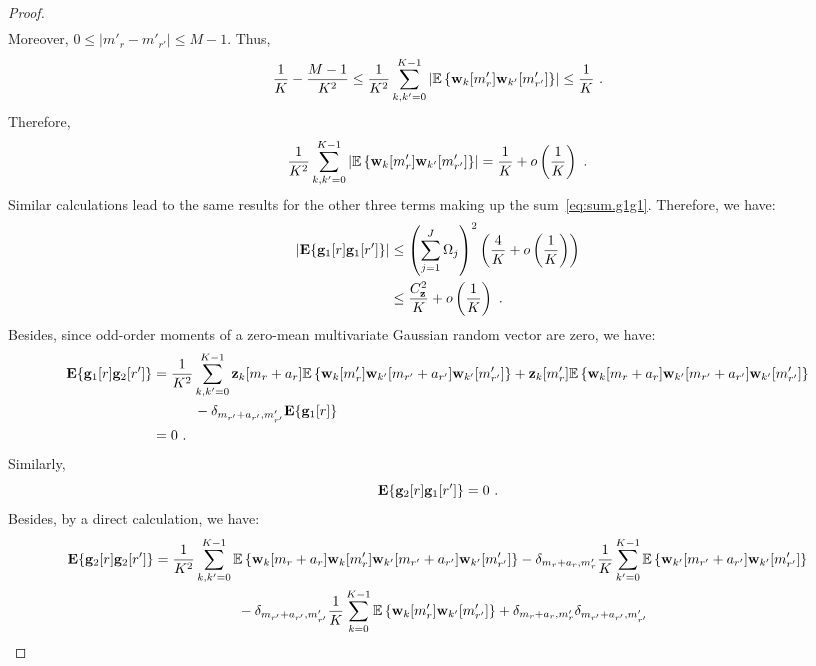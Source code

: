 \documentclass[journal,onecolumn]{IEEEtran}
\begin{document}
\begin{proof}
\begin{align*}
\end{align*}
Moreover, $0\leq\left|m'_r-m'_{r'}\right|\leq M-1$. Thus,
\begin{align*}
\dfrac1{K} - \dfrac{M-1}{K^2}\leq \dfrac1{K^2}\sum_{k,k'=0}^{K-1} \left|{\mathbb E}\left\{{\mathbf w}_k[m'_r]{\mathbf w}_{k'}[m'_{r'}]\right\}\right| \leq \dfrac1{K}\ .
\end{align*}
Therefore,
\begin{align*}
\dfrac1{K^2}\sum_{k,k'=0}^{K-1} \left|{\mathbb E}\left\{{\mathbf w}_k[m'_r]{\mathbf w}_{k'}[m'_{r'}]\right\}\right| = \dfrac1{K} + o\left(\dfrac1K\right)\ .
\end{align*}
Similar calculations lead to the same results for the other three terms making up the sum~\eqref{eq:sum.g1g1}.  Therefore, we have:
\begin{align}
\nonumber
\left|\bE\{\bg_1[r]\bg_1[r']\}\right| &\leq \left(\sum_{j=1}^J \Omega_j\right)^2 \left(\dfrac4{K} + o\left(\dfrac1{K}\right) \right) \\
&\leq \dfrac{C_\bz^2}{K} + o\left(\dfrac1{K}\right)\ .
\label{eq:g1g1}
\end{align}
Besides, since odd-order moments of a zero-mean multivariate Gaussian random vector are zero, we have:
\begin{align}
\nonumber
\bE\{\bg_1[r]\bg_2[r']\} & = \dfrac1{K^2}\sum_{k,k'=0}^{K-1} \bz_k[m_r+a_r]\EE\left\{\bw_k[m'_r]\bw_{k'}[m_{r'}+a_{r'}]\bw_{k'}[m'_{r'}]\right\} + \bz_k[m'_r]\EE\left\{\bw_k[m_r+a_r]\bw_{k'}[m_{r'}+a_{r'}]\bw_{k'}[m'_{r'}]\right\}\\
\nonumber
&\hspace{30pt} - \delta_{m_{r'}+a_{r'},m'_{r'}}\bE\{\bg_1[r]\} \\
& = 0\ .
\label{eq:g1g2}
\end{align}
Similarly,
\begin{equation}
\bE\{\bg_2[r]\bg_1[r']\} = 0\ .
\label{eq:g2g1}
\end{equation}
Besides, by a direct calculation, we have:
\begin{align}
\nonumber
\bE\{\bg_2[r]\bg_2[r']\} &= \dfrac1{K^2}\sum_{k,k'=0}^{K-1} \EE\left\{\bw_{k}[m_{r}+a_{r}]\bw_{k}[m'_{r}]\bw_{k'}[m_{r'}+a_{r'}]\bw_{k'}[m'_{r'}]\right\} - \delta_{m_{r}+a_{r},m'_{r}}\dfrac1{K}\sum_{k'=0}^{K-1} \EE\left\{\bw_{k'}[m_{r'}+a_{r'}]\bw_{k'}[m'_{r'}]\right\} \\
\nonumber
&\hspace{60pt} - \delta_{m_{r'}+a_{r'},m'_{r'}}\dfrac1{K}\sum_{k=0}^{K-1} \EE\left\{\bw_k[m'_r]\bw_{k'}[m'_{r'}]\right\} + \delta_{m_{r}+a_{r},m'_{r}}\delta_{m_{r'}+a_{r'},m'_{r'}} \\

\end{align}
\end{proof}
\end{document}
